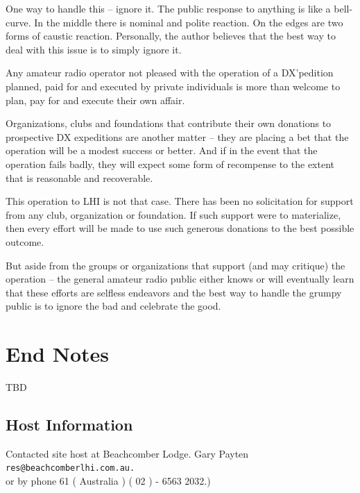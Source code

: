 \documentclass[11pt]{article}
\begin{document}
One way to handle this -- ignore it.   The public response to anything
is like a bell-curve.  In the middle there is nominal and polite reaction.
On the edges are two forms of caustic reaction.  Personally, the author
believes that the best way to deal with this issue is to simply ignore it.
\par
Any amateur radio operator not pleased with the operation of a DX'pedition
planned, paid for and executed by private individuals is more than welcome
to plan, pay for and execute their own affair.
\par
Organizations, clubs and foundations that contribute their own donations
to prospective DX expeditions are another matter -- they are placing a bet
that the operation will be a modest success or better.  And if in the
event that the operation fails badly, they will expect some form of
recompense to the extent that is reasonable and recoverable.
\par
This operation to LHI is not that case.  There has been no solicitation
for support from any club, organization or foundation.  If such
support were to materialize, then every effort will be made to use such
generous donations to the best possible outcome.
\par
But aside from the groups or organizations that support (and may 
critique) the operation -- the general amateur radio public either knows
or will eventually learn that these efforts are selfless endeavors
and the best way to handle the grumpy public is to ignore the bad and
celebrate the good.


\section{End Notes}

TBD

\par

\subsection{Host Information}
Contacted site host at Beachcomber Lodge.
Gary Payten\\
{\small\texttt{res@beachcomberlhi.com.au.}}\\
or by phone 61 ( Australia )  ( 02 ) - 6563 2032.)

\appendix
\end{document}
